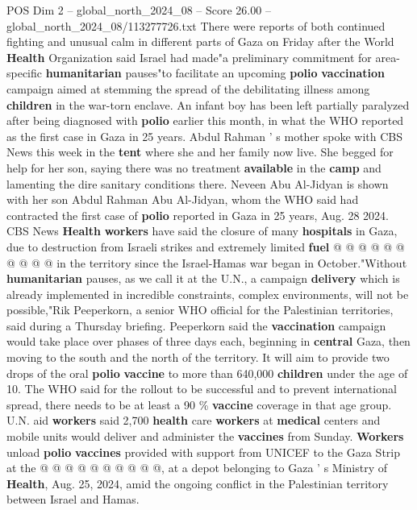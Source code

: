 \begin{textsample}{POS Dim 2 – global\_north\_2024\_08 – Score 26.00 – global\_north\_2024\_08/113277726.txt}  \label{ex:f2_pos_397}
There were reports of both continued fighting and unusual calm in different parts of Gaza on Friday after the World \textbf{Health} Organization said Israel had made"a preliminary commitment for area-specific \textbf{humanitarian} pauses"to facilitate an upcoming \textbf{polio} \textbf{vaccination} campaign aimed at stemming the spread of the debilitating illness among \textbf{children} in the war-torn enclave.
An infant boy has been left partially paralyzed after being diagnosed with \textbf{polio} earlier this month, in what the WHO reported as the first case in Gaza in 25 years.
Abdul Rahman ' s mother spoke with CBS News this week in the \textbf{tent} where she and her family now live.
She begged for help for her son, saying there was no treatment \textbf{available} in the \textbf{camp} and lamenting the dire sanitary conditions there.
Neveen Abu Al-Jidyan is shown with her son Abdul Rahman Abu Al-Jidyan, whom the WHO said had contracted the first case of \textbf{polio} reported in Gaza in 25 years, Aug. 28 2024.
CBS News \textbf{Health} \textbf{workers} have said the closure of many \textbf{hospitals} in Gaza, due to destruction from Israeli strikes and extremely limited \textbf{fuel} @ @ @ @ @ @ @ @ @ @ in the territory since the Israel-Hamas war began in October."Without \textbf{humanitarian} pauses, as we call it at the U.N., a campaign \textbf{delivery} which is already implemented in incredible constraints, complex environments, will not be possible,"Rik Peeperkorn, a senior WHO official for the Palestinian territories, said during a Thursday briefing.
Peeperkorn said the \textbf{vaccination} campaign would take place over phases of three days each, beginning in \textbf{central} Gaza, then moving to the south and the north of the territory.
It will aim to provide two drops of the oral \textbf{polio} \textbf{vaccine} to more than 640,000 \textbf{children} under the age of 10.
The WHO said for the rollout to be successful and to prevent international spread, there needs to be at least a 90 \% \textbf{vaccine} coverage in that age group.
U.N. aid \textbf{workers} said 2,700 \textbf{health} care \textbf{workers} at \textbf{medical} centers and mobile units would deliver and administer the \textbf{vaccines} from Sunday. \textbf{Workers} unload \textbf{polio} \textbf{vaccines} provided with support from UNICEF to the Gaza Strip at the @ @ @ @ @ @ @ @ @ @, at a depot belonging to Gaza ' s Ministry of \textbf{Health}, Aug. 25, 2024, amid the ongoing conflict in the Palestinian territory between Israel and Hamas.

\end{textsample}
